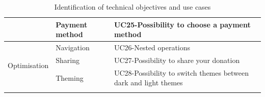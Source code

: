 \begin{longtable}{|m{10em}|m{10em}|m{10em}|}
                                              & \multirow{1}{*}{Payment method}          & UC25-Possibility to choose a payment method                     \\\hline
      \multirow{3}{*}{Optimisation}           & \multirow{1}{*}{Navigation}              & UC26-Nested operations                                          \\\cline{2-3}
                                              & \multirow{1}{*}{Sharing}                 & UC27-Possibility to share your donation                         \\\cline{2-3}
                                              & \multirow{1}{*}{Theming}                 & UC28-Possibility to switch themes between dark and light themes \\\hline

      \caption{Identification of technical objectives and use cases}
      \label{tab:id_tech_objec_uc}
\end{longtable}

